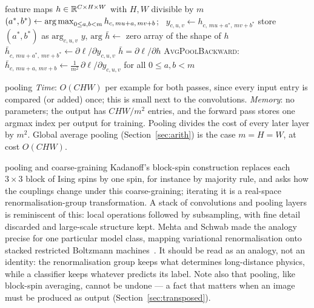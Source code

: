 \documentclass[11pt]{article}
\begin{document}
\begin{algorithm}[htbp]
\caption{Max pooling ($m \times m$ blocks, stride $m$): forward and backward}\label{alg:pool}
\begin{algorithmic}[1]
\Require feature maps $h \in \mathbb{R}^{C \times H \times W}$ with $H, W$ divisible by $m$
    \State $(a^*, b^*) \gets \operatorname*{arg\,max}_{0 \le a, b < m} h_{c,\,mu+a,\,mv+b}$; \ $y_{c,u,v} \gets h_{c,\,mu+a^*,\,mv+b^*}$
    \State store $(a^*, b^*)$ as $\mathrm{arg}_{c,u,v}$ 
  \EndFor
  \State \Return $y$, $\mathrm{arg}$
\EndFunction
{}
  \State $\bar h \gets$ zero array of the shape of $h$
    \State $\bar h_{c,\,mu+a^*,\,mv+b^*} \gets \partial \ell/\partial y_{c,u,v}$ 
  \EndFor
  \State \Return $\bar h = \partial \ell/\partial h$
\EndFunction
\Statex \textsc{AvgPoolBackward}: $\bar h_{c,\,mu+a,\,mv+b} \gets \frac{1}{m^2}\,\partial \ell/\partial y_{c,u,v}$ for all $0 \le a, b < m$
\end{algorithmic}
\end{algorithm}

\begin{runtime}{pooling}
\emph{Time}: $O(CHW)$ per example for both passes, since every input entry is compared (or added) once; this is small
next to the convolutions. \emph{Memory}: no parameters; the output has $CHW/m^2$ entries, and the forward pass stores
one argmax index per output for training. Pooling divides the cost of every later layer by $m^2$. Global average
pooling (Section~\ref{sec:arith}) is the case $m = H = W$, at cost $O(CHW)$.
\end{runtime}

\begin{physics}{pooling and coarse-graining}
Kadanoff's block-spin construction replaces each $3 \times 3$ block of Ising spins by one spin, for instance by majority
rule, and asks how the couplings change under this coarse-graining; iterating it is a real-space renormalisation-group
transformation. A stack of convolutions and pooling layers is reminiscent of this: local operations followed by
subsampling, with fine detail discarded and large-scale structure kept. Mehta and Schwab made the analogy precise for one
particular model class, mapping variational renormalisation onto stacked restricted Boltzmann
machines~\cite{mehta2014}. It should be read as an analogy, not an identity: the renormalisation group keeps what
determines long-distance physics, while a classifier keeps whatever predicts its label. Note also that pooling, like
block-spin averaging, cannot be undone --- a fact that matters when an image must be produced as output
(Section~\ref{sec:transposed}).
\end{physics}
\end{document}
